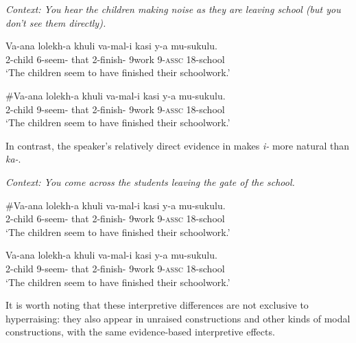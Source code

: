 \documentclass[output=paper,colorlinks,citecolor=brown
]{langscibook}
\begin{document}
\textit{Context: You hear the children making noise as they are leaving school (but you don't see them directly).}

\begin{xlist}

\ex
\gll Va-ana lolekh-a khuli va-mal-i kasi y-a mu-sukulu.\\
2-child 6\Sm-seem-\Fv{} that 2\Sm-finish-\Pst{} 9work 9-\textsc{assc} 18-school\\
\glt `The children seem to have finished their schoolwork.'

\ex         
\#\gll Va-ana lolekh-a khuli va-mal-i kasi y-a mu-sukulu.\\
2-child 9\Sm-seem-\Fv{} that 2\Sm-finish-\Pst{} 9work 9-\textsc{assc} 18-school\\
\glt `The children seem to have finished their schoolwork.' \\\citep[151]{diercksetal2022luyia}

\end{xlist}


\z

\noindent In contrast, the speaker's relatively direct evidence in  makes \textit{i-} more natural than \textit{ka-}.

\ea\label{ex:johnson:HrWithDirectEvidence}

\textit{Context: You come across the students leaving the gate of the school.}

\begin{xlist}

\ex
\#\gll Va-ana lolekh-a khuli va-mal-i kasi y-a mu-sukulu.\\
2-child 6\Sm-seem-\Fv{} that 2\Sm-finish-\Pst{} 9work 9-\textsc{assc} 18-school\\
\glt `The children seem to have finished their schoolwork.'

\ex         
\gll Va-ana lolekh-a khuli va-mal-i kasi y-a mu-sukulu.\\
2-child 9\Sm-seem-\Fv{} that 2\Sm-finish-\Pst{} 9work 9-\textsc{assc} 18-school\\
\glt `The children seem to have finished their schoolwork.' \\ \citep[150]{diercksetal2022luyia}

\end{xlist}

\z

It is worth noting that these interpretive differences are not exclusive to hyperraising: they also appear in unraised constructions and other kinds of modal constructions, with the same evidence-based interpretive effects.
\end{document}

